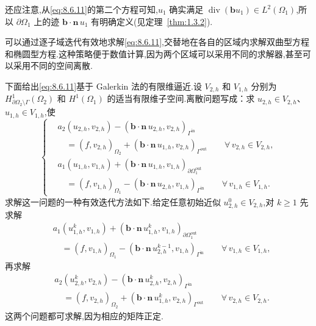 还应注意,从\eqref{eq:8.6.11}的第二个方程可知,\(u_1\) 确实满足 \(\operatorname{div}(\boldsymbol{b}u_1)\in L^2(\Omega_1)\),所以 \(\partial\Omega_1\) 上的迹 \(\boldsymbol{b}\cdot\boldsymbol{n}\,u_1\) 有明确定义(见定理~\ref{thm:1.3.2}).

可以通过逐子域迭代有效地求解\eqref{eq:8.6.11},交替地在各自的区域内求解双曲型方程和椭圆型方程.这种策略便于数值计算,因为两个区域可以采用不同的求解器,甚至可以采用不同的空间离散.

下面给出\eqref{eq:8.6.11}基于 Galerkin 法的有限维逼近.设 \(V_{2,h}\) 和 \(V_{1,h}\) 分别为 \(H^1_{\partial\Omega_2\setminus\Gamma}(\Omega_2)\) 和 \(H^1(\Omega_1)\) 的适当有限维子空间.离散问题写成：求 \(u_{2,h}\in V_{2,h}\)、\(u_{1,h}\in V_{1,h}\),使
\begin{equation}\label{eq:8.6.15}
  \left\{
  \begin{aligned}
    &a_2(u_{2,h},v_{2,h})-(\boldsymbol{b}\cdot\boldsymbol{n}\,u_{2,h},v_{2,h})_{\Gamma^{\mathrm{in}}}\\
    &\quad=(f,v_{2,h})_{\Omega_2}+(\boldsymbol{b}\cdot\boldsymbol{n}\,u_{1,h},v_{2,h})_{\Gamma^{\mathrm{out}}}
         \qquad\forall\,v_{2,h}\in V_{2,h},\\
    &a_1(u_{1,h},v_{1,h})+(\boldsymbol{b}\cdot\boldsymbol{n}\,u_{1,h},v_{1,h})_{\partial\Omega_1^{\mathrm{out}}}\\
    &\quad=(f,v_{1,h})_{\Omega_1}-(\boldsymbol{b}\cdot\boldsymbol{n}\,u_{2,h},v_{1,h})_{\Gamma^{\mathrm{in}}}
         \qquad\forall\,v_{1,h}\in V_{1,h}.
  \end{aligned}
  \right.
\end{equation}
求解这一问题的一种有效迭代方法如下.给定任意初始近似 \(u_{2,h}^0\in V_{2,h}\),对 \(k\ge1\) 先求解
\begin{equation}\label{eq:8.6.16}
  \begin{aligned}
    &a_1(u_{1,h}^k,v_{1,h})+(\boldsymbol{b}\cdot\boldsymbol{n}\,u_{1,h}^k,v_{1,h})_{\partial\Omega_1^{\mathrm{out}}}\\
    &\quad=(f,v_{1,h})_{\Omega_1}-(\boldsymbol{b}\cdot\boldsymbol{n}\,u_{2,h}^{k-1},v_{1,h})_{\Gamma^{\mathrm{in}}}
         \qquad\forall\,v_{1,h}\in V_{1,h},
  \end{aligned}
\end{equation}
再求解
\begin{equation}\label{eq:8.6.17}
  \begin{aligned}
    &a_2(u_{2,h}^k,v_{2,h})-(\boldsymbol{b}\cdot\boldsymbol{n}\,u_{2,h}^k,v_{2,h})_{\Gamma^{\mathrm{in}}}\\
    &\quad=(f,v_{2,h})_{\Omega_2}+(\boldsymbol{b}\cdot\boldsymbol{n}\,u_{1,h}^k,v_{2,h})_{\Gamma^{\mathrm{out}}}
         \qquad\forall\,v_{2,h}\in V_{2,h}.
  \end{aligned}
\end{equation}
这两个问题都可求解,因为相应的矩阵正定.

